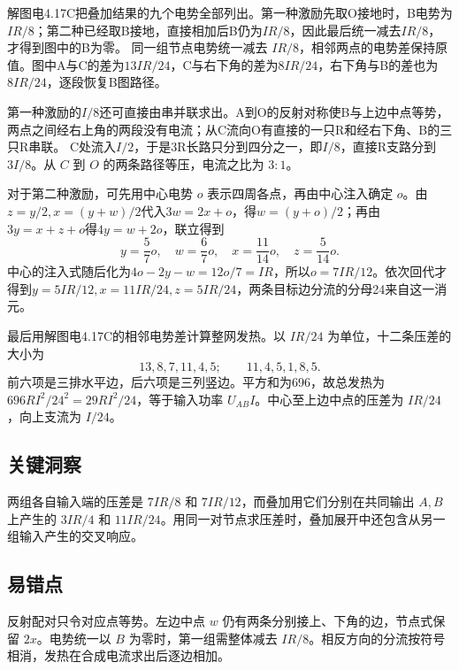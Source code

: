 \documentclass[UTF8,fontset=fandol,a4paper,11pt]{ctexart}
\begin{document}
解图电4.17C把叠加结果的九个电势全部列出。第一种激励先取O接地时，B电势为$IR/8$；第二种已经取B接地，直接相加后B仍为$IR/8$，因此最后统一减去$IR/8$，才得到图中的B为零。
同一组节点电势统一减去 $IR/8$，相邻两点的电势差保持原值。图中A与C的差为$13IR/24$，C与右下角的差为$8IR/24$，右下角与B的差也为$8IR/24$，逐段恢复B图路径。

第一种激励的$I/8$还可直接由串并联求出。A到O的反射对称使B与上边中点等势，两点之间经右上角的两段没有电流；从C流向O有直接的一只R和经右下角、B的三只R串联。
C处流入$I/2$，于是3R长路只分到四分之一，即$I/8$，直接R支路分到$3I/8$。从 $C$ 到 $O$ 的两条路径等压，电流之比为 $3:1$。

对于第二种激励，可先用中心电势 $o$ 表示四周各点，再由中心注入确定 $o$。由$z=y/2,x=(y+w)/2$代入$3w=2x+o$，得$w=(y+o)/2$；再由$3y=x+z+o$得$4y=w+2o$，联立得到
\[
y=\frac57o,\quad w=\frac67o,\quad x=\frac{11}{14}o,\quad z=\frac5{14}o.
\]
中心的注入式随后化为$4o-2y-w=12o/7=IR$，所以$o=7IR/12$。依次回代才得到$y=5IR/12,x=11IR/24,z=5IR/24$，两条目标边分流的分母24来自这一消元。

最后用解图电4.17C的相邻电势差计算整网发热。以 $IR/24$ 为单位，十二条压差的大小为
\[
13,8,7,11,4,5;\qquad11,4,5,1,8,5.
\]
前六项是三排水平边，后六项是三列竖边。平方和为696，故总发热为$696RI^2/24^2=29RI^2/24$，等于输入功率 $U_{AB}I$。中心至上边中点的压差为 $IR/24$，向上支流为 $I/24$。




\subsection*{关键洞察}

两组各自输入端的压差是 $7IR/8$ 和 $7IR/12$，而叠加用它们分别在共同输出 $A,B$ 上产生的 $3IR/4$ 和 $11IR/24$。用同一对节点求压差时，叠加展开中还包含从另一组输入产生的交叉响应。



\subsection*{易错点}

反射配对只令对应点等势。左边中点 $w$ 仍有两条分别接上、下角的边，节点式保留 $2x$。电势统一以 $B$ 为零时，第一组需整体减去 $IR/8$。相反方向的分流按符号相消，发热在合成电流求出后逐边相加。

\end{document}
